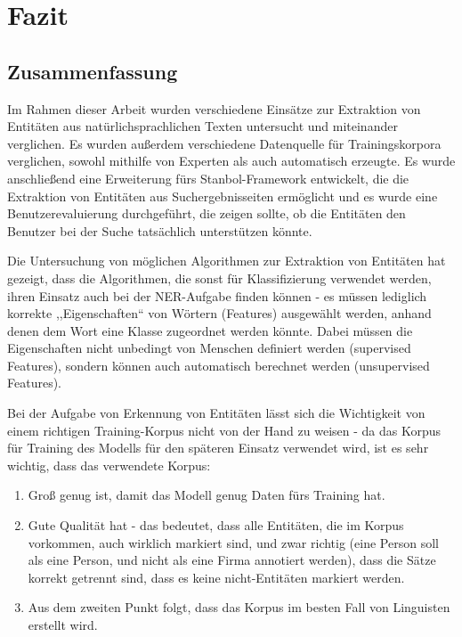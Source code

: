 \chapter{Fazit}

\section{Zusammenfassung}
Im Rahmen dieser Arbeit wurden verschiedene Einsätze zur Extraktion von Entitäten aus natürlichsprachlichen Texten untersucht und miteinander verglichen. Es wurden außerdem verschiedene Datenquelle für Trainingskorpora verglichen, sowohl mithilfe von Experten als auch automatisch erzeugte. Es wurde anschließend eine Erweiterung fürs Stanbol-Framework entwickelt, die die Extraktion von Entitäten aus Suchergebnisseiten ermöglicht und es wurde eine Benutzerevaluierung durchgeführt, die zeigen sollte, ob die Entitäten den Benutzer bei der Suche tatsächlich unterstützen könnte. 

Die Untersuchung von möglichen Algorithmen zur Extraktion von Entitäten hat gezeigt, dass die Algorithmen, die sonst für Klassifizierung verwendet werden, ihren Einsatz auch bei der NER-Aufgabe finden können - es müssen lediglich korrekte ,,Eigenschaften`` von Wörtern (Features) ausgewählt werden, anhand denen dem Wort eine Klasse zugeordnet werden könnte. Dabei müssen die Eigenschaften nicht unbedingt von Menschen definiert werden (supervised Features), sondern können auch automatisch berechnet werden (unsupervised Features).

Bei der Aufgabe von Erkennung von Entitäten lässt sich die Wichtigkeit von einem richtigen Training-Korpus nicht von der Hand zu weisen - da das Korpus für Training des Modells für den späteren Einsatz verwendet wird, ist es sehr wichtig, dass das verwendete Korpus:
\begin{enumerate}
\item Groß genug ist, damit das Modell genug Daten fürs Training hat.
\item Gute Qualität hat - das bedeutet, dass alle Entitäten, die im Korpus vorkommen, auch wirklich markiert sind, und zwar richtig (eine Person soll als eine Person, und nicht als eine Firma annotiert werden), dass die Sätze korrekt getrennt sind, dass es keine nicht-Entitäten markiert werden.
\item Aus dem zweiten Punkt folgt, dass das Korpus im besten Fall von Linguisten erstellt wird.
\end{enumerate}

